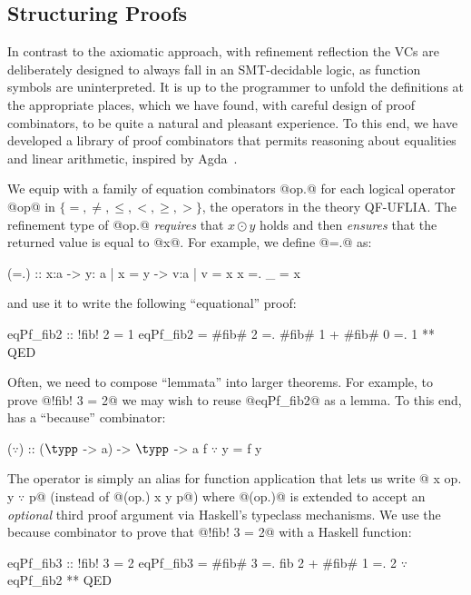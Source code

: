 \subsection{Structuring Proofs}

In contrast to the axiomatic approach,
with refinement reflection the VCs are
deliberately designed to always fall in
an SMT-decidable logic, as function symbols
are uninterpreted.
%
It is up to the programmer to unfold the
definitions at the appropriate places,
which we have found, with careful design
of proof combinators, to be quite
a natural and pleasant experience.
%
To this end, we have developed a library
of proof combinators that permits reasoning
about equalities and linear arithmetic,
inspired by Agda~\citep{agdaequational}.

%
We equip \toolname with a family of
equation combinators @op.@ for each
logical operator @op@ in
$\{=, \not =, \leq, <, \geq, > \}$,
the operators in the theory QF-UFLIA.
%
The refinement type of @op.@  \emph{requires}
that $x \odot y$ holds and then \emph{ensures}
that the returned value is equal to @x@.
%
For example, we define @=.@ as:
%
\begin{mcode}
    (=.) :: x:a -> y:{ a | x = y} -> { v:a | v = x }
    x =. _ = x
\end{mcode}
%
and use it to write the following ``equational'' proof:
%
\begin{mcode}
    eqPf_fib2 :: { !fib! 2 = 1 }
    eqPf_fib2 =  #fib# 2 =. #fib# 1 + #fib# 0 =. 1 ** QED
\end{mcode} %

%
Often, we need to compose ``lemmata'' into larger
theorems. For example, to prove @!fib! 3 = 2@ we
may wish to reuse @eqPf_fib2@ as a lemma.
%
To this end, \toolname has a ``because'' combinator:
%
\begin{mcode}
    ($\because$) :: ($\typp$ -> a) -> $\typp$ -> a
    f $\because$ y = f y
\end{mcode}
%
The operator is simply an alias for function
application that lets us write
%
@ x op. y $\because$ p@ (instead of @(op.) x y p@)
where @(op.)@ is extended to accept an \textit{optional} third proof
argument via Haskell's typeclass mechanisms.
%
We use the because combinator to
prove that @!fib! 3 = 2@ with a Haskell function:
%
\begin{mcode}
    eqPf_fib3 :: { !fib! 3 = 2 }
    eqPf_fib3 =  #fib# 3 =. fib 2 + #fib# 1 =. 2 $\because$ eqPf_fib2 ** QED
\end{mcode}

